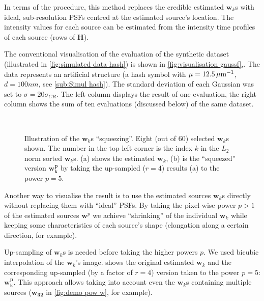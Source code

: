 In terms of the \inmf{} procedure, this method replaces the credible estimated $\bm{w}_k$s with ideal, sub-resolution PSFs centred at the estimated source's location. The intensity values for each source can be estimated from the intensity time profiles of each source (rows of $\bm{H}$). 

The conventional visualisation of the \inmf{} evaluation of the synthetic dataset (illustrated in \autoref{fig:simulated data hash}) is shown in \autoref{fig:visualisation gaussf}\aaa,\bbb. The data represents an artificial structure (a hash symbol with $\mu = 12.5\, \mathrm{\mu m}^{-1}$, $d=100 \unit{nm}$, see \autoref{sub:Simul hash}). The standard deviation of each Gaussian was set to $\sigma=20\sigma_{CR}$. The left column displays the result of one evaluation, the right column shows the sum of ten evaluations (discussed below) of the same dataset.

\begin{figure}[!hbt]
	\newcommand{\sizef}{.8}			
	\newcommand{\widthfig}{1\textwidth}	
	\centering
	\\
	\caption{Illustration of the $\bm{w}_k$s ``squeezing''. Eight (out of 60) selected $\bm{w}_k$s  shown. The number in the top left corner is the index $k$ in the $L_2$ norm sorted $\bm{w}_k$s. (a) shows the \inmf{} estimated $\bm{w}_k$, (b) is the ``squeezed'' version  $\bm{w_k^p}$ by taking the up-sampled ($r=4$) results (a) to the power $p=5$.}
	\label{fig:demo pow w}	
\end{figure}

Another way to visualise the result is to use the estimated sources $\bm{w}_k$s directly without replacing them with ``ideal'' PSFs. By taking the pixel-wise power $p>1$ of the estimated sources $\bm{w}^p$ we achieve ``shrinking'' of the individual $\bm{w}_k$ while keeping some characteristics of each source's shape (elongation along a certain direction, for example). 

Up-sampling of $\bm{w}_k$s is needed before taking the higher powers $p$. We used bicubic interpolation of the $\bm{w}_k$'s image.  shows the original estimated $\bm{w}_k$ and the corresponding up-sampled (by a factor of $r=4$) version taken to the power $p=5$: $\bm{w^p_k}$. This approach allows taking into account even the $\bm{w}_k$s containing multiple sources ($\bm{w_{32}}$ in \autoref{fig:demo pow w}, for example).

